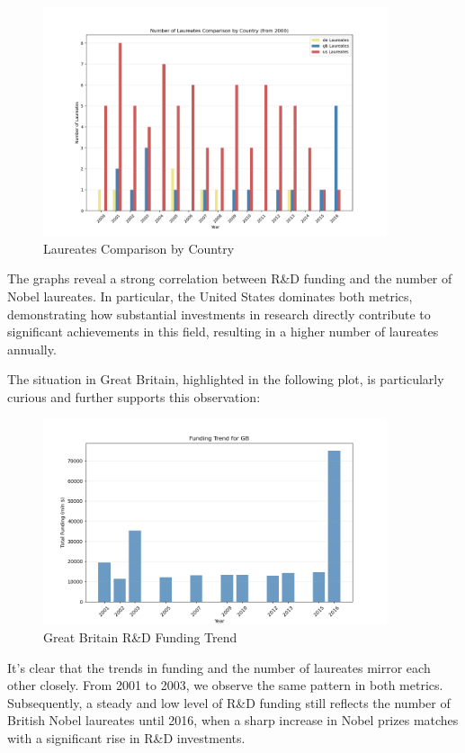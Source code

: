 \documentclass{article}
\begin{document}
\begin{figure}[h!]
	\centering
	\includegraphics[width=0.9\textwidth]{../queries/plots/laureates_comparison_by_country.png}
	\caption{Laureates Comparison by Country}
\end{figure}

The graphs reveal a strong correlation between R\&D funding and the number of Nobel laureates. In particular, the United States dominates both metrics, demonstrating how substantial investments in research directly contribute to significant achievements in this field, resulting in a higher number of laureates annually.

The situation in Great Britain, highlighted in the following plot, is particularly curious and further supports this observation:

\begin{figure}[h!]
	\centering
	\includegraphics[width=0.9\textwidth]{../queries/plots/gb_funding_trend_bar.png}
	\caption{Great Britain R\&D Funding Trend}
\end{figure}

It's clear that the trends in funding and the number of laureates mirror each other closely. From 2001 to 2003, we observe the same pattern in both metrics. Subsequently, a steady and low level of R\&D funding still reflects the number of British Nobel laureates until 2016, when a sharp increase in Nobel prizes matches with a significant rise in R\&D investments.
\end{document}
